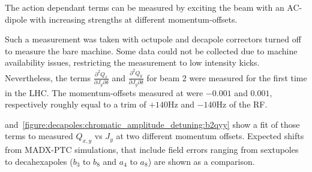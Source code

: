 The action dependant terms can be measured by exciting the beam with an AC-dipole with increasing
strengths at different momentum-offsets.

Such a measurement was taken with octupole and decapole correctors turned off to measure the bare
machine. Some data could not be collected due to machine availability issues, restricting the
measurement to low intensity kicks. 
Nevertheless, the terms $\frac{\partial^2 Q_x}{\partial J_y \partial \delta}$ and $\frac{\partial^2
Q_y}{\partial J_y \partial \delta}$ for beam 2 were measured for the first time in the LHC. The
momentum-offsets measured at were $-0.001$ and $0.001$, respectively roughly equal to a trim of 
$+140$Hz and $-140$Hz of the RF.

and~\cref{figure:decapoles:chromatic_amplitude_detuning:b2qyy} show a fit of those terms to measured
$Q_{x,y}$ vs $J_{y}$ at two different momentum offsets. Expected shifts from MADX-PTC simulations,
that include field errors ranging from sextupoles to decahexapoles ($b_3$ to $b_8$ and $a_4$ to
$a_8$) are shown as a comparison.


